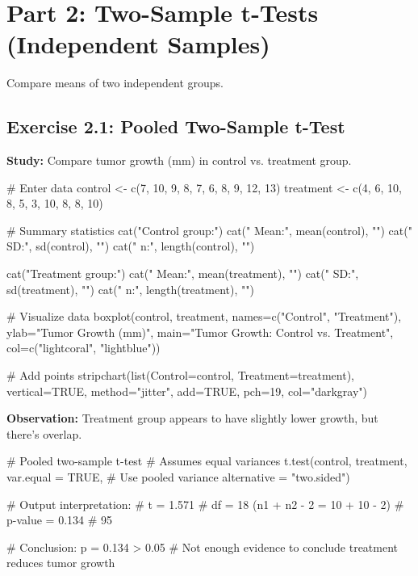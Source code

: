 \documentclass[11pt]{article}
\begin{document}
\section{Part 2: Two-Sample t-Tests (Independent Samples)}

Compare means of two independent groups.

\subsection{Exercise 2.1: Pooled Two-Sample t-Test}

\textbf{Study:} Compare tumor growth (mm) in control vs. treatment group.

\begin{rcode}
# Enter data
control <- c(7, 10, 9, 8, 7, 6, 8, 9, 12, 13)
treatment <- c(4, 6, 10, 8, 5, 3, 10, 8, 8, 10)

# Summary statistics
cat("Control group:\n")
cat("  Mean:", mean(control), "\n")
cat("  SD:", sd(control), "\n")
cat("  n:", length(control), "\n\n")

cat("Treatment group:\n")
cat("  Mean:", mean(treatment), "\n")
cat("  SD:", sd(treatment), "\n")
cat("  n:", length(treatment), "\n\n")

# Visualize data
boxplot(control, treatment,
        names=c("Control", "Treatment"),
        ylab="Tumor Growth (mm)",
        main="Tumor Growth: Control vs. Treatment",
        col=c("lightcoral", "lightblue"))

# Add points
stripchart(list(Control=control, Treatment=treatment),
           vertical=TRUE, method="jitter", add=TRUE,
           pch=19, col="darkgray")
\end{rcode}

\textbf{Observation:} Treatment group appears to have slightly lower growth, but there's overlap.

\newpage

\begin{rcode}
# Pooled two-sample t-test
# Assumes equal variances
t.test(control, treatment,
       var.equal = TRUE,         # Use pooled variance
       alternative = "two.sided")

# Output interpretation:
# t = 1.571
# df = 18 (n1 + n2 - 2 = 10 + 10 - 2)
# p-value = 0.134
# 95%

# Conclusion: p = 0.134 > 0.05
# Not enough evidence to conclude treatment reduces tumor growth
\end{rcode}
\end{document}
